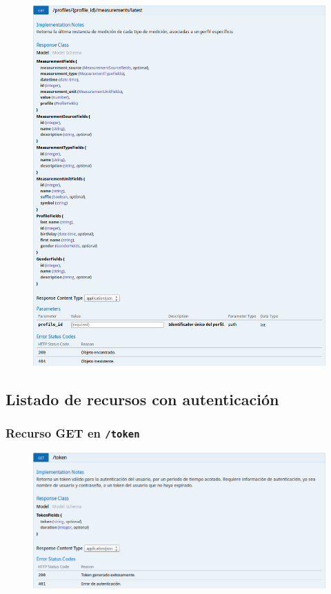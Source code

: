 \begin{figure}[h]
  \centering
  \includegraphics[width=\textwidth,height=.75\textheight,keepaspectratio]{img/especificacion_api/profileLatestMeasurementList_get}
  \label{profileLatestMeasurementList_get}
\end{figure}

\newpage


\subsection{Listado de recursos con autenticación}

\subsubsection{Recurso GET en \texttt{/token}}

\begin{figure}[h]
  \centering
  \includegraphics[width=\textwidth,height=.75\textheight,keepaspectratio]{img/especificacion_api/token_get}
  \label{token_get}
\end{figure}

